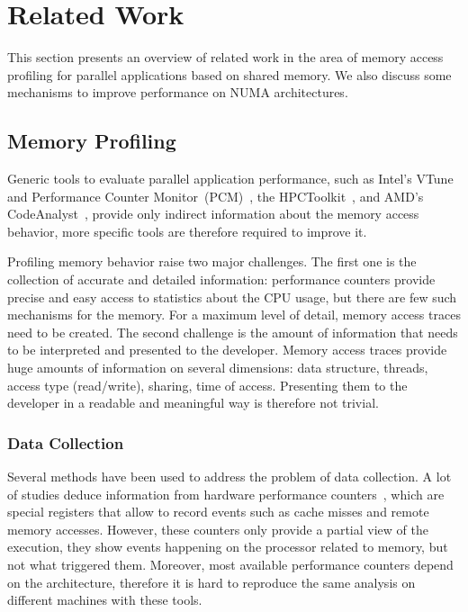 
\section{Related Work}
\label{sec:soa}

This section presents an overview of related work in the area of memory access
profiling for parallel applications based on shared memory.
We also discuss some mechanisms to improve performance on NUMA architectures.

\subsection{Memory Profiling}
\label{sec:soa-profiling}

Generic tools to evaluate parallel application performance, such as Intel's
VTune~\cite{Reinders05VTune} and Performance Counter
Monitor~(PCM)~\cite{Intel2012b}, the HPCToolkit~\cite{Adhianto10HPCTOOLKIT},
and AMD's CodeAnalyst~\cite{Drongowski2008}, provide only indirect information
about the memory access behavior, more specific tools are therefore required to improve it.

Profiling memory behavior raise two major challenges.
The first one is the collection of accurate and detailed information: performance counters provide precise and easy access to statistics about the CPU usage, but there are few such mechanisms for the memory.
For a maximum level of detail, memory access traces need to be created.
The second challenge is the amount of information that needs to be interpreted and presented to the developer.
Memory access traces provide huge amounts of information on several
dimensions: data structure, threads, access type (read/write), sharing, time of access.
Presenting them to the developer in a readable and meaningful way is therefore not trivial.

\subsubsection{Data Collection}

Several methods have been used to address the problem of data collection. A
lot of studies deduce information from hardware performance
counters~\cite{Majo13(Mis)understanding,
Jiang14Understanding,Bosch00Rivet,Weyers14Visualization,Tao01Visualizing,DeRose01Hardware},
which are special registers that allow to record events such as cache misses and remote
memory accesses. However, these counters only provide a partial
view of the execution, they show events happening on the processor related to
memory, but not what triggered them. Moreover, most available performance counters
depend on the architecture, therefore it is hard to reproduce the same
analysis on different machines with these tools.


